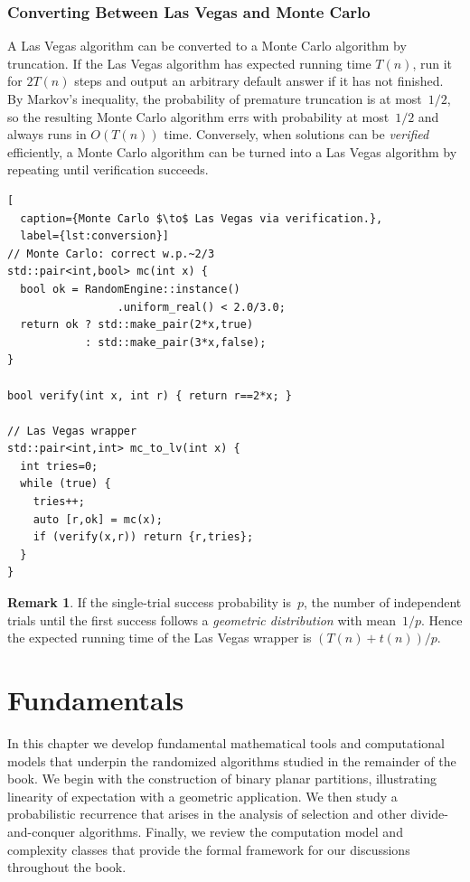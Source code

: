 \documentclass[twoside,12pt]{book}
\theoremstyle{plain}
\theoremstyle{definition}
\newtheorem{remark}[theorem]{Remark}
\theoremstyle{remark}
\begin{document}
\subsection{Converting Between Las Vegas and Monte Carlo}

A Las Vegas algorithm can be converted to a Monte Carlo algorithm by
truncation.  If the Las Vegas algorithm has expected running time
$T(n)$, run it for $2T(n)$ steps and output an arbitrary default
answer if it has not finished.  By Markov's inequality, the
probability of premature truncation is at most~$1/2$, so the resulting
Monte Carlo algorithm errs with probability at most~$1/2$ and always
runs in $O(T(n))$ time.  Conversely, when solutions can be
\emph{verified} efficiently, a Monte Carlo algorithm can be turned
into a Las Vegas algorithm by repeating until verification succeeds.

\begin{lstlisting}[
  caption={Monte Carlo $\to$ Las Vegas via verification.},
  label={lst:conversion}]
// Monte Carlo: correct w.p.~2/3
std::pair<int,bool> mc(int x) {
  bool ok = RandomEngine::instance()
                 .uniform_real() < 2.0/3.0;
  return ok ? std::make_pair(2*x,true)
            : std::make_pair(3*x,false);
}

bool verify(int x, int r) { return r==2*x; }

// Las Vegas wrapper
std::pair<int,int> mc_to_lv(int x) {
  int tries=0;
  while (true) {
    tries++;
    auto [r,ok] = mc(x);
    if (verify(x,r)) return {r,tries};
  }
}
\end{lstlisting}

\begin{remark}
If the single-trial success probability is~$p$, the number of independent
trials until the first success follows a \emph{geometric distribution} with
mean~$1/p$.  Hence the expected running time of the Las Vegas wrapper is
$(T(n)+t(n))/p$.
\end{remark}

\chapter{Fundamentals}
\label{ch:fundamentals}

In this chapter we develop fundamental mathematical tools and computational
models that underpin the randomized algorithms studied in the remainder of
the book. We begin with the construction of binary planar partitions,
illustrating linearity of expectation with a geometric application. We then
study a probabilistic recurrence that arises in the analysis of selection
and other divide-and-conquer algorithms. Finally, we review the computation
model and complexity classes that provide the formal framework for our
discussions throughout the book.
\end{document}
